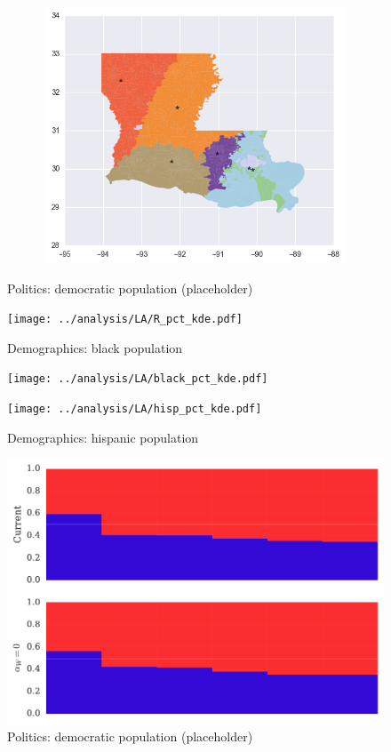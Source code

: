 \begin{figure}[htb!]
\includegraphics[width=5in,height=3in,keepaspectratio]{../maps/LA/static/0_25_after.png}
\end{figure}

\clearpage
\newpage

\begin{figure}[htb!] \centering
\caption{ Politics: democratic population (placeholder)}
\texttt{[image: ../analysis/LA/R\_pct\_kde.pdf]}
\caption{ Demographics: black population }
\texttt{[image: ../analysis/LA/black\_pct\_kde.pdf]}
\caption{ Demographics: hispanic population }
\texttt{[image: ../analysis/LA/hisp\_pct\_kde.pdf]}
\end{figure}

\clearpage
\newpage

\begin{figure}[htb!] \centering
\caption{ Politics: democratic population (placeholder)}
\includegraphics[width=6in]{../analysis/LA/barplot.pdf}
\end{figure}

